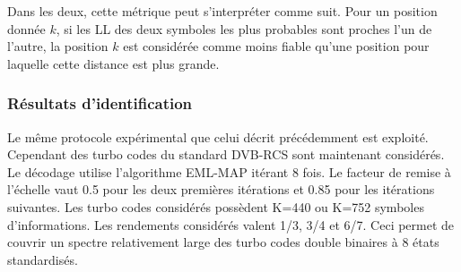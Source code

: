 Dans les deux, cette métrique peut s'interpréter comme suit. Pour un position donnée $k$, si les LL des deux symboles les 
plus probables sont proches l'un de l'autre, la position $k$ est considérée comme moins fiable qu'une position pour
laquelle cette distance est plus grande.

\subsubsection{Résultats d'identification}
Le même protocole expérimental que celui décrit précédemment est exploité. Cependant des turbo codes du standard DVB-RCS
sont maintenant considérés. Le décodage utilise l'algorithme EML-MAP itérant 8 fois. Le facteur de remise à l'échelle 
vaut 0.5 pour les deux premières itérations et 0.85 pour les itérations suivantes. Les turbo codes considérés possèdent K=440
ou K=752 symboles d'informations. Les rendements considérés valent 1/3, 3/4 et 6/7. Ceci permet de couvrir un spectre 
relativement large des turbo codes double binaires à 8 états standardisés. 

